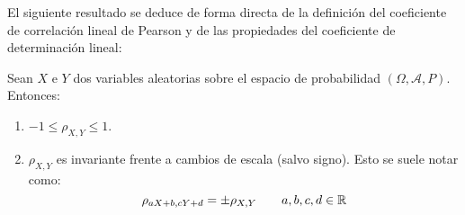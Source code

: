 El siguiente resultado se deduce de forma directa de la definición del coeficiente de correlación lineal de Pearson y de las propiedades del coeficiente de determinación lineal:
\begin{prop}
    Sean $X$ e $Y$ dos variables aleatorias sobre el espacio de probabilidad $(\Omega, \mathcal{A}, P)$. Entonces:
    \begin{enumerate}
        \item $-1\leq \rho_{X,Y} \leq 1$.
        \item $\rho_{X,Y}$ es invariante frente a cambios de escala (salvo signo). Esto se suele notar como:
        \begin{equation*}
            \rho_{aX+b,cY+d} = \pm \rho_{X,Y}\qquad a,b,c,d\in\mathbb{R}
        \end{equation*}
    \end{enumerate}
\end{prop}